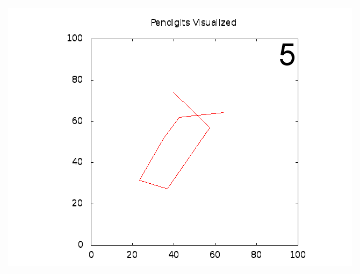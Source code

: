 \documentclass{article}
\begin{document}
\begin{figure}[h!]
\begin{subfigure}
    \label{picture-label}
  \end{subfigure}
  \begin{subfigure}
    \centering
    \includegraphics[scale=0.3,bb=0 0 640 480]{images/mean5.png}
    \label{picture-label}
  \end{subfigure}
\end{figure}
\end{document}
